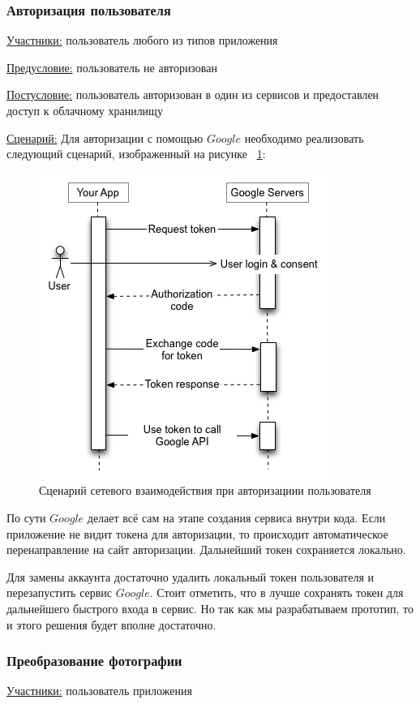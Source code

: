 \subsubsection{Авторизация пользователя}
\underline{Участники:} пользователь любого из типов приложения

\underline{Предусловие:} пользователь не авторизован

\underline{Постусловие:} пользователь авторизован в один из сервисов и предоставлен доступ к облачному хранилищу

\underline{Сценарий:}
Для авторизации с помощью $Google$ необходимо реализовать следующий сценарий, изображенный на рисунке ~\ref{auth}:

\begin{figure}
    \includegraphics[scale=0.5]{img/use_cases/authorization.png}
    \caption{Сценарий сетевого взаимодействия при авторизациии пользователя \cite{OAuth_google}}
    \label{auth}
\end{figure}

По сути $Google$ делает всё сам на этапе создания сервиса внутри кода. Если приложение не видит токена для авторизации, то происходит автоматическое перенаправление на сайт авторизации. Дальнейший токен сохраняется локально.

Для замены аккаунта достаточно удалить локальный токен пользователя и перезапустить сервис $Google$. Стоит отметить, что в лучше сохранять токен для дальнейшего быстрого входа в сервис. Но так как мы разрабатываем прототип, то и этого решения будет вполне достаточно.

\subsubsection{Преобразование фотографии}
\underline{Участники:} пользователь приложения

